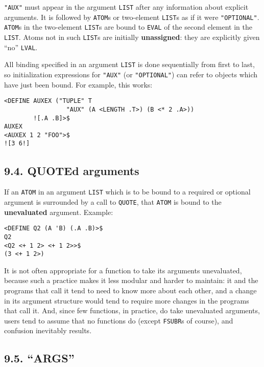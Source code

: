 \documentclass[a4paper,]{article}
\begin{document}
\texttt{"AUX"} must appear in the argument \texttt{LIST} after any information about explicit arguments. It is followed by
\texttt{ATOM}s or two-element \texttt{LIST}s as if it were \texttt{"OPTIONAL"}. 
\texttt{ATOM}s in the two-element \texttt{LIST}s are bound to \texttt{EVAL} of the second element in the \texttt{LIST}.
Atoms not in such \texttt{LIST}s are initially \textbf{unassigned}: they are explicitly given ``no'' \texttt{LVAL}.

All binding specified in an argument \texttt{LIST} is done sequentially from first to last, so initialization expressions
for \texttt{"AUX"} (or \texttt{"OPTIONAL"}) can refer to objects which have just been bound. For example, this works:

\begin{verbatim}
<DEFINE AUXEX ("TUPLE" T
                 "AUX" (A <LENGTH .T>) (B <* 2 .A>))
        ![.A .B]>$
AUXEX
<AUXEX 1 2 "FOO">$
![3 6!]
\end{verbatim}

\subsection{9.4. QUOTEd arguments}\label{quoted-arguments}

If an \texttt{ATOM} in an argument \texttt{LIST} which is to be bound to a required or optional argument is surrounded by a
call to \texttt{QUOTE}, that \texttt{ATOM} is bound to the \textbf{unevaluated} argument. Example:

\begin{verbatim}
<DEFINE Q2 (A 'B) (.A .B)>$
Q2
<Q2 <+ 1 2> <+ 1 2>>$
(3 <+ 1 2>)
\end{verbatim}

It is not often appropriate for a function to take its arguments unevaluated, because such a practice makes it less modular
and harder to maintain: it and the programs that call it tend to need to know more about each other, and a change in its
argument structure would tend to require more changes in the programs that call it. And, since few functions, in practice,
do take unevaluated arguments, users tend to assume that no functions do (except \texttt{FSUBR}s of course), and confusion
inevitably results.

\subsection{\texorpdfstring{9.5. ``ARGS''}{9.5. ARGS}}\label{args}
\end{document}
